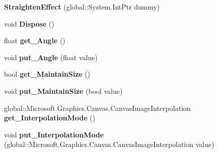 \begin{DoxyCompactItemize}
{\bfseries Straighten\+Effect} (global\+::\+System.\+Int\+Ptr dummy)
\item 
\mbox{\label{class_microsoft_1_1_graphics_1_1_canvas_1_1_effects_1_1_straighten_effect_a6b0f5e8965a47aa6c9936114246eb1c7}} 
void {\bfseries Dispose} ()
\item 
\mbox{\label{class_microsoft_1_1_graphics_1_1_canvas_1_1_effects_1_1_straighten_effect_a0ed44f705cd9b56c26587217c200b6d1}} 
float {\bfseries get\+\_\+\+Angle} ()
\item 
\mbox{\label{class_microsoft_1_1_graphics_1_1_canvas_1_1_effects_1_1_straighten_effect_a61d26b5e4774cad176cd3ee601b7faf4}} 
void {\bfseries put\+\_\+\+Angle} (float value)
\item 
\mbox{\label{class_microsoft_1_1_graphics_1_1_canvas_1_1_effects_1_1_straighten_effect_adda549672074ceb59e7119d5cc5f4cbc}} 
bool {\bfseries get\+\_\+\+Maintain\+Size} ()
\item 
\mbox{\label{class_microsoft_1_1_graphics_1_1_canvas_1_1_effects_1_1_straighten_effect_aeebcec8cdc0176631d083ffd75d72763}} 
void {\bfseries put\+\_\+\+Maintain\+Size} (bool value)
\item 
\mbox{\label{class_microsoft_1_1_graphics_1_1_canvas_1_1_effects_1_1_straighten_effect_ad23e6c9cc37bdaff9615259972c047d6}} 
global\+::\+Microsoft.\+Graphics.\+Canvas.\+Canvas\+Image\+Interpolation {\bfseries get\+\_\+\+Interpolation\+Mode} ()
\item 
\mbox{\label{class_microsoft_1_1_graphics_1_1_canvas_1_1_effects_1_1_straighten_effect_acf34cd5322f264253235a1dcaa442ba8}} 
void {\bfseries put\+\_\+\+Interpolation\+Mode} (global\+::\+Microsoft.\+Graphics.\+Canvas.\+Canvas\+Image\+Interpolation value)
\item 

\end{DoxyCompactItemize}
